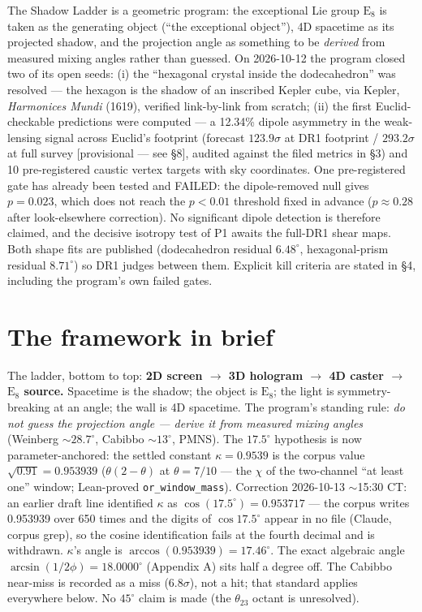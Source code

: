 \documentclass{alienfolio}
\begin{document}
The Shadow Ladder is a geometric program: the exceptional Lie group
$\mathrm{E}_8$ is taken as the generating object (``the exceptional
object''), 4D spacetime as its projected shadow, and the projection angle
as something to be \emph{derived} from measured mixing angles rather
than guessed. On 2026-10-12 the program closed two of its open seeds:
(i) the ``hexagonal crystal inside the dodecahedron'' was resolved ---
the hexagon is the shadow of an inscribed Kepler cube, via Kepler,
\emph{Harmonices Mundi} (1619), verified link-by-link from scratch;
(ii) the first Euclid-checkable predictions were computed --- a 12.34\%
dipole asymmetry in the weak-lensing signal across Euclid's footprint
(forecast $123.9\sigma$ at DR1 footprint / $293.2\sigma$ at full survey
[provisional --- see \S8], audited against the filed
metrics in \S3) and 10 pre-registered caustic vertex targets with sky
coordinates. One pre-registered gate has already been tested and FAILED: the dipole-removed null gives $p = 0.023$, which does not reach the $p < 0.01$ threshold fixed in advance ($p \approx 0.28$ after look-elsewhere correction). No significant dipole detection is therefore claimed, and the decisive isotropy test of P1 awaits the full-DR1 shear maps. Both shape fits are published (dodecahedron residual
$6.48^\circ$, hexagonal-prism residual $8.71^\circ$) so DR1 judges between
them. Explicit kill criteria are stated in \S4, including the program's
own failed gates.

\section{The framework in brief}
\label{sec:framework}

The ladder, bottom to top: \textbf{2D screen $\to$ 3D hologram $\to$ 4D
caster $\to$ $\mathrm{E}_8$ source.} Spacetime is the shadow; the object
is $\mathrm{E}_8$; the light is symmetry-breaking at an angle; the wall
is 4D spacetime. The program's standing rule: \emph{do not guess the
projection angle --- derive it from measured mixing angles} (Weinberg
$\sim$$28.7^\circ$, Cabibbo $\sim$$13^\circ$, PMNS). The $17.5^\circ$
hypothesis is now parameter-anchored: the settled constant $\kappa =
0.9539$ is the corpus value $\sqrt{0.91} = 0.953939$ ($\theta(2-\theta)$
at $\theta = 7/10$ --- the $\chi$ of the two-channel ``at least one''
window; Lean-proved \texttt{or\_window\_mass}). Correction 2026-10-13
$\sim$15:30 CT: an earlier draft line identified $\kappa$ as
$\cos(17.5^\circ) = 0.953717$ --- the corpus writes 0.953939 over 650
times and the digits of $\cos 17.5^\circ$ appear in no file (Claude,
corpus grep), so the cosine identification fails at the fourth decimal
and is withdrawn. $\kappa$'s angle is $\arccos(0.953939) = 17.46^\circ$.
The exact algebraic angle $\arcsin(1/2\phi) = 18.0000^\circ$ (Appendix A)
sits half a degree off. The Cabibbo near-miss is recorded as a miss
($6.8\sigma$), not a hit; that standard applies everywhere below. No
$45^\circ$ claim is made (the $\theta_{23}$ octant is unresolved).
\end{document}
